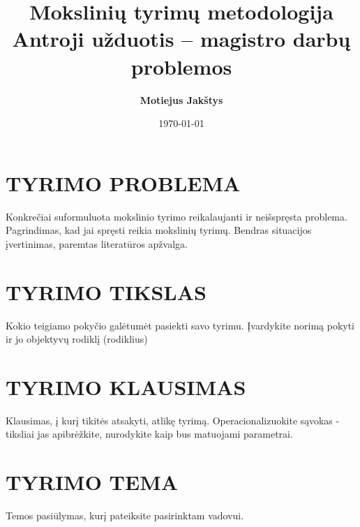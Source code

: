 \documentclass{article}
\title{Mokslinių tyrimų metodologija\\ \vspace{4mm} 
Antroji užduotis -- magistro darbų problemos}
\author{\bf Motiejus Jak\v{s}tys\\ \bf}
\date{\today}
\begin{document}
\maketitle

\section{TYRIMO PROBLEMA}

Konkrečiai suformuluota mokslinio tyrimo reikalaujanti ir neišspręsta problema.
Pagrindimas, kad jai spręsti reikia mokslinių tyrimų. Bendras situacijos
įvertinimas, paremtas literatūros apžvalga. 

\section{TYRIMO TIKSLAS}

Kokio teigiamo pokyčio galėtumėt pasiekti savo tyrimu. Įvardykite norimą pokyti
ir jo objektyvų rodiklį (rodiklius)

\section{TYRIMO KLAUSIMAS}

Klausimas, į kurį tikitės atsakyti, atlikę tyrimą. Operacionalizuokite sąvokas
- tiksliai jas apibrėžkite, nurodykite kaip bus matuojami parametrai.  

\section{TYRIMO TEMA}

Temos pasiūlymas, kurį pateiksite pasirinktam vadovui. 
\end{document}
